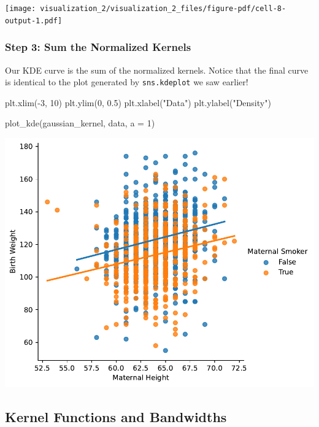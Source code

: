 \documentclass[
  letterpaper,
  DIV=11,
  numbers=noendperiod]{scrreprt}
\newenvironment{Shaded}{\begin{snugshade}}{\end{snugshade}}
\newcommand{\DecValTok}[1]{\textcolor[rgb]{0.68,0.00,0.00}{#1}}
\newcommand{\FloatTok}[1]{\textcolor[rgb]{0.68,0.00,0.00}{#1}}
\newcommand{\NormalTok}[1]{\textcolor[rgb]{0.00,0.23,0.31}{#1}}
\newcommand{\OperatorTok}[1]{\textcolor[rgb]{0.37,0.37,0.37}{#1}}
\newcommand{\StringTok}[1]{\textcolor[rgb]{0.13,0.47,0.30}{#1}}
\begin{document}
\texttt{[image: visualization\_2/visualization\_2\_files/figure-pdf/cell-8-output-1.pdf]}

\subsubsection{Step 3: Sum the Normalized
Kernels}\label{step-3-sum-the-normalized-kernels}

Our KDE curve is the sum of the normalized kernels. Notice that the
final curve is identical to the plot generated by \texttt{sns.kdeplot}
we saw earlier!

\begin{Shaded}
\begin{Highlighting}[]
\NormalTok{plt.xlim(}\OperatorTok{{-}}\DecValTok{3}\NormalTok{, }\DecValTok{10}\NormalTok{)}
\NormalTok{plt.ylim(}\DecValTok{0}\NormalTok{, }\FloatTok{0.5}\NormalTok{)}
\NormalTok{plt.xlabel(}\StringTok{"Data"}\NormalTok{)}
\NormalTok{plt.ylabel(}\StringTok{"Density"}\NormalTok{)}

\NormalTok{plot\_kde(gaussian\_kernel, data, a }\OperatorTok{=} \DecValTok{1}\NormalTok{)}
\end{Highlighting}
\end{Shaded}

\includegraphics{visualization_2/visualization_2_files/figure-pdf/cell-9-output-1.pdf}

\subsection{Kernel Functions and
Bandwidths}\label{kernel-functions-and-bandwidths}
\end{document}
